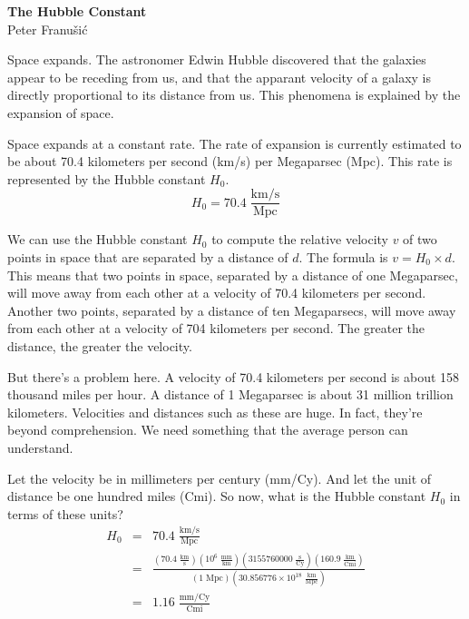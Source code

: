 \documentclass{report}
\begin{document}
\begin{center}
\textbf{\Huge The Hubble Constant} \\
\vspace{2ex}
\textrm{\Large Peter Franu\v si\'c} \\
\end{center}
\vspace{0.5in}

Space expands.
The astronomer Edwin Hubble discovered that the galaxies appear to be receding from us,
and that the apparant velocity of a galaxy is directly proportional to its distance from us.
This phenomena is explained by the expansion of space.

Space expands at a constant rate.
The rate of expansion is currently estimated to be about 
70.4 kilometers per second (km/s) per Megaparsec (Mpc).
This rate is represented by the Hubble constant $H_0$.
\begin{equation*}
  H_0 = 70.4 \; \textstyle{\frac{\mathrm{km/s}}{\mathrm{Mpc}}}
\end{equation*}

We can use the Hubble constant $H_0$ to compute the relative velocity $v$ 
of two points in space that are separated by a distance of $d$.
The formula is $  v = H_0 \times d$.
This means that two points in space, separated by a distance of one Megaparsec,
will move away from each other at a velocity of 70.4 kilometers per second.
Another two points, separated by a distance of ten Megaparsecs,
will move away from each other at a velocity of 704 kilometers per second.
The greater the distance, the greater the velocity.

But there's a problem here.
A velocity of 70.4 kilometers per second is about 158 thousand miles per hour.
A distance of 1 Megaparsec is about 31 million trillion kilometers.
Velocities and distances such as these are huge.
In fact, they're beyond comprehension.
We need something that the average person can understand.

Let the velocity be in millimeters per century (mm/Cy).
And let the unit of distance be one hundred miles (Cmi).
So now, what is the Hubble constant $H_0$ in terms of these units?
\begin{eqnarray*}
  H_0 &=& 70.4 \; \textstyle{\frac{\mathrm{km/s}}{\mathrm{Mpc}}} \\
      &=& \frac{(70.4 \; \textstyle{\frac{\mathrm{km}}{\mathrm{s}}})
                (10^6 \; \textstyle{\frac{\mathrm{mm}}{\mathrm{km}}})
                (3155760000 \; \textstyle{\frac{\mathrm{s}}{\mathrm{Cy}}})
                (160.9 \; \textstyle{\frac{\mathrm{km}}{\mathrm{Cmi}}})}
               {(1 \; \mathrm{\scriptstyle{Mpc}}) 
		(30.856776 \times 10^{18} \; \textstyle{\frac{\mathrm{km}}{\mathrm{Mpc}}})} \\
      &=& 1.16 \; \textstyle{\frac{\mathrm{mm/Cy}}{\mathrm{Cmi}}}
\end{eqnarray*}
\end{document}
